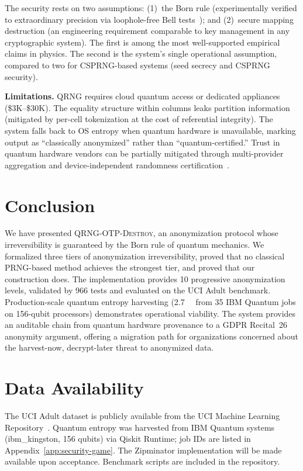 \documentclass[acmsmall,screen,review,anonymous]{acmart}
\begin{document}
The security rests on two assumptions: (1)~the Born rule (experimentally verified to extraordinary precision via loophole-free Bell tests~\cite{hensen2015loophole}); and (2)~secure mapping destruction (an engineering requirement comparable to key management in any cryptographic system). The first is among the most well-supported empirical claims in physics. The second is the system's single operational assumption, compared to two for CSPRNG-based systems (seed secrecy and CSPRNG security).

\textbf{Limitations.} QRNG requires cloud quantum access or dedicated appliances (\$3K--\$30K). The equality structure within columns leaks partition information (mitigated by per-cell tokenization at the cost of referential integrity). The system falls back to OS entropy when quantum hardware is unavailable, marking output as ``classically anonymized'' rather than ``quantum-certified.'' Trust in quantum hardware vendors can be partially mitigated through multi-provider aggregation and device-independent randomness certification~\cite{liu2025certified}.

\section{Conclusion}
\label{sec:conclusion}

We have presented \textsc{QRNG-OTP-Destroy}, an anonymization protocol whose irreversibility is guaranteed by the Born rule of quantum mechanics. We formalized three tiers of anonymization irreversibility, proved that no classical PRNG-based method achieves the strongest tier, and proved that our construction does. The implementation provides 10 progressive anonymization levels, validated by 966 tests and evaluated on the UCI Adult benchmark. Production-scale quantum entropy harvesting (\SI{2.7}{\mega\byte} from 35 IBM Quantum jobs on 156-qubit processors) demonstrates operational viability. The system provides an auditable chain from quantum hardware provenance to a GDPR Recital~26 anonymity argument, offering a migration path for organizations concerned about the harvest-now, decrypt-later threat to anonymized data.

\section*{Data Availability}
The UCI Adult dataset is publicly available from the UCI Machine Learning Repository~\cite{dua2019uci}. Quantum entropy was harvested from IBM Quantum systems (ibm\_kingston, 156 qubits) via Qiskit Runtime; job IDs are listed in Appendix~\ref{app:security-game}. The Zipminator implementation will be made available upon acceptance. Benchmark scripts are included in the repository.
\end{document}
